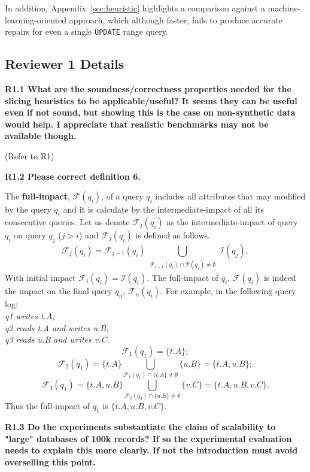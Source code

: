In addition, Appendix~\ref{sec:heuristic} highlights a comparison against a machine-learning-oriented approach, which although faster, fails to produce accurate repairs for even a single \texttt{UPDATE} range query.  


\subsection*{Reviewer 1 Details}
\noindent \textbf{R1.1 What are the soundness/correctness properties needed for the slicing heuristics to be applicable/useful? It seems they can be useful even if not sound, but showing this is the case on non-synthetic data would help. I appreciate that realistic benchmarks may not be available though.}

(Refer to R1)

\noindent \textbf{R1.2 Please correct definition 6.} 

The \textbf{full-impact}, $\mathcal{F}(q_i)$, of a query $q_i$ includes all attributes that may modified by the query $q_i$ and it is calculate by the intermediate-impact of all its consecutive queries. Let us denote $\mathcal{F}_j(q_i)$ as the intermediate-impact of query $q_i$ on query $q_j$ ($j > i$) and $\mathcal{F}_j(q_i)$ is defined as follows.
 \[
    \mathcal{F}_j(q_i)=\mathcal{F}_{j-1}(q_i)\bigcup_{\substack{\mathcal{F}_{j-1}(q_i)\cap \mathcal{P}(q_j) \neq \emptyset}} \mathcal{I}(q_j),
 \]
With initial impact $\mathcal{F}_i(q_i)  = \mathcal{I}(q_i)$. The full-impact of $q_i$, $\mathcal{F}(q_i)$ is indeed the impact on the final query $q_n$, $\mathcal{F}_n(q_i)$. For example, in the following query log:\\
\textit{q1 writes t.A; \\
q2 reads t.A and writes u.B; \\
q3 reads u.B and writes v.C.}\\
\[\mathcal{F}_1(q_1) = \{t.A\};\] 
\[\mathcal{F}_2(q_1) = \{t.A\} \bigcup_{\mathcal{F}_1(q_1) \cap \{t.A\} \neq \emptyset} \{u.B\} = \{t.A, u.B\};\]
\[\mathcal{F}_3(q_1) = \{t.A, u.B\}\bigcup_{\mathcal{F}_2(q_2) \cap \{u.B\} \neq \emptyset} \{v.C\} = \{t.A, u.B, v.C\}.\]
Thus the full-impact of $q_1$ is $\{t.A, u.B, v.C\}$.

\noindent \textbf{R1.3 Do the experiments substantiate the claim of scalability to "large" databases of 100k records? If so the experimental evaluation needs to explain this more clearly. If not the introduction must avoid overselling this point.}

